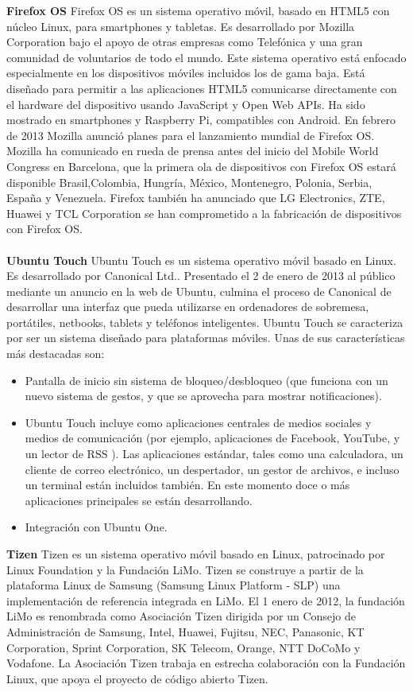 {\bf Firefox OS}
Firefox OS es un sistema operativo móvil, basado en HTML5 con núcleo Linux, para smartphones y tabletas. Es desarrollado por Mozilla Corporation bajo el apoyo de otras empresas como Telefónica y una gran comunidad de voluntarios de todo el mundo. Este sistema operativo está enfocado especialmente en los dispositivos móviles incluidos los de gama baja. Está diseñado para permitir a las aplicaciones HTML5 comunicarse directamente con el hardware del dispositivo usando JavaScript y Open Web APIs. Ha sido mostrado en smartphones y Raspberry Pi, compatibles con Android.
En febrero de 2013 Mozilla anunció planes para el lanzamiento mundial de Firefox OS. Mozilla ha comunicado en rueda de prensa antes del inicio del Mobile World Congress en Barcelona, que la primera ola de dispositivos con Firefox OS estará disponible Brasil,Colombia, Hungría, México, Montenegro, Polonia, Serbia, España y Venezuela. Firefox también ha anunciado que LG Electronics, ZTE, Huawei y TCL Corporation se han comprometido a la fabricación de dispositivos con Firefox OS.
\\
\\
{\bf Ubuntu Touch}
Ubuntu Touch es un sistema operativo móvil basado en Linux. Es desarrollado por Canonical Ltd.. Presentado el 2 de enero de 2013 al público mediante un anuncio en la web de Ubuntu, culmina el proceso de Canonical de desarrollar una interfaz que pueda utilizarse en ordenadores de sobremesa, portátiles, netbooks, tablets y teléfonos inteligentes.
Ubuntu Touch se caracteriza por ser un sistema diseñado para plataformas móviles. Unas de sus características más destacadas son:
\begin{itemize}
	 \item Pantalla de inicio sin sistema de bloqueo/desbloqueo (que funciona con un nuevo sistema de gestos, y que se aprovecha para mostrar notificaciones).
 	 \item Ubuntu Touch incluye como aplicaciones centrales de medios sociales y medios de comunicación (por ejemplo, aplicaciones de Facebook, YouTube, y un lector de RSS ). Las aplicaciones estándar, tales como una calculadora, un cliente de correo electrónico, un despertador, un gestor de archivos, e incluso un terminal están incluidos también. En este momento doce o más aplicaciones principales se están desarrollando.
 	 \item Integración con Ubuntu One.
\end{itemize}


{\bf Tizen}
Tizen es un sistema operativo móvil basado en Linux, patrocinado por Linux Foundation y la Fundación LiMo. Tizen se construye a partir de la plataforma Linux de Samsung (Samsung Linux Platform - SLP) una implementación de referencia integrada en LiMo. El 1 enero de 2012, la fundación LiMo es renombrada como Asociación Tizen dirigida por un Consejo de Administración de Samsung, Intel, Huawei, Fujitsu, NEC, Panasonic, KT Corporation, Sprint Corporation, SK Telecom, Orange, NTT DoCoMo y Vodafone. La Asociación Tizen trabaja en estrecha colaboración con la Fundación Linux, que apoya el proyecto de código abierto Tizen.

